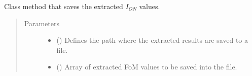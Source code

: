 \documentclass[letterpaper,10pt,english,openany, oneside]{sphinxmanual}
\begin{document}
\begin{fulllineitems}
\begin{fulllineitems}
\end{fulllineitems}


\begin{fulllineitems}
\label{\detokenize{index:fompy.fom.ion_ext.save_results_to_file}}
Class method that saves the extracted \(I_{ON}\) values.
\begin{quote}\begin{description}
\item[{Parameters}] \leavevmode\begin{itemize}
\item {} 
 () \textendash{} Defines the path where the extracted results are saved to a file.

\item {} 
 () \textendash{} Array of extracted FoM values to be saved into the file.

\end{itemize}

\end{description}\end{quote}

\end{fulllineitems}


\end{fulllineitems}

\end{document}
